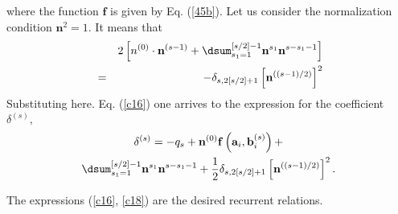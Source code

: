 \documentclass[twocolumn,showpacs,preprintnumbers]{revtex4}
\begin{document}
where the function $\mathbf{f}$ is given by Eq. (\ref{45b}). Let us consider
the normalization condition $\mathbf{n}^{2}=1.$ It means that%
\begin{eqnarray}
&&2\left[ n^{\left( 0\right) }\cdot \mathbf{n}^{\left( s-1\right)
}+\dsum_{s_{1}=1}^{\left[ s/2\right] -1}\mathbf{n}^{s_{1}}\mathbf{n}%
^{s-s_{1}-1}\right]   \notag \\
&=&-\delta _{s,2\left[ s/2\right] +1}\left[ \mathbf{n}^{\left( \left(
s-1\right) /2\right) }\right] ^{2}  \label{c17}
\end{eqnarray}%
Substituting here. Eq. (\ref{c16}) one arrives to the expression for the
coefficient $\delta ^{\left( s\right) },$%
\begin{gather}
\delta ^{\left( s\right) }=-q_{s}+\mathbf{n}^{\left( 0\right) }\mathbf{f}%
\left( \mathbf{a}_{i},\mathbf{b}_{i}^{\left( s\right) }\right) +  \notag \\
\dsum_{s_{1}=1}^{\left[ s/2\right] -1}\mathbf{n}^{s_{1}}\mathbf{n}%
^{s-s_{1}-1}+\dfrac{1}{2}\delta _{s,2\left[ s/2\right] +1}\left[ \mathbf{n}%
^{\left( \left( s-1\right) /2\right) }\right] ^{2}.  \label{c18}
\end{gather}

The expressions (\ref{c16}, \ref{c18}) are the desired recurrent relations.
\end{document}
